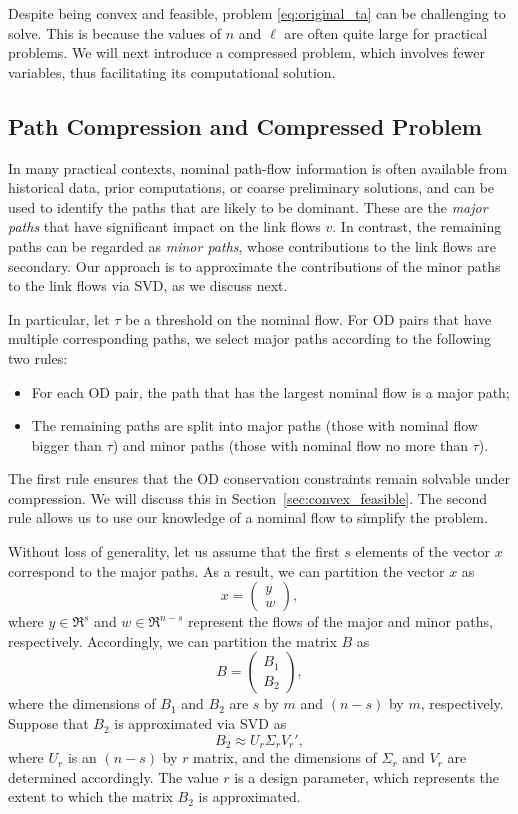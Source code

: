 \documentclass[11pt]{article}
\begin{document}
Despite being convex and feasible, problem \eqref{eq:original_ta} can be challenging to solve. This is because the values of $n$ and $\ell$ are often quite large for practical problems. We will next introduce a compressed problem, which involves fewer variables, thus facilitating its computational solution.





\subsection{Path Compression and Compressed Problem}
\label{sec:compression}

In many practical contexts, nominal path-flow information is often available from historical data, prior computations, or coarse preliminary solutions, and can be used to identify the paths that are likely to be dominant. These are the \emph{major paths} that have significant impact on the link flows $v$. In contrast, the remaining paths can be regarded as \emph{minor paths}, whose contributions to the link flows are secondary. Our approach is to approximate the contributions of the minor paths to the link flows via SVD, as we discuss next.

In particular, let $\tau$ be a threshold on the nominal flow. For OD pairs that have multiple corresponding paths,  we select major paths according to the following two rules:
\begin{itemize}
    \item[1)] For each OD pair, the path that has the largest nominal flow is a major path; 
    \item[2)] The remaining paths are split into major paths (those with nominal flow bigger than $\tau$) and minor paths (those with nominal flow no more than $\tau$).  
\end{itemize}

The first rule ensures that the OD conservation constraints remain solvable under compression. We will discuss this in Section~\ref{sec:convex_feasible}. The second rule allows us to use our knowledge of a nominal flow to simplify the problem. 

Without loss of generality, let us assume that the first $s$ elements of the vector $x$ correspond to the major paths. As a result, we can partition the vector $x$ as
$$x=\begin{pmatrix}
    y\\
    w
\end{pmatrix},$$
where $y\in \Re^s$ and $w\in \Re^{n-s}$ represent the flows of the major and minor paths, respectively. Accordingly, we can partition the matrix $B$ as
$$B=\begin{pmatrix}
    B_1\\
    B_2
\end{pmatrix},$$
where the dimensions of $B_1$ and $B_2$ are $s$ by $m$ and $(n-s)$ by $m$, respectively. Suppose that $B_2$ is approximated via SVD as
$$B_2\approx U_r\Sigma_r V_r',$$
where $U_r$ is an $(n-s)$ by $r$ matrix, and the dimensions of $\Sigma_r$ and $V_r$ are determined accordingly. The value $r$ is a design parameter, which represents the extent to which the matrix $B_2$ is approximated.
\end{document}
